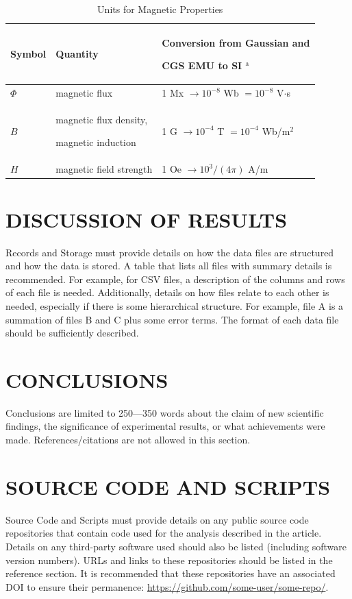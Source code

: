 \documentclass{IEEEoj-data}
\begin{document}
\begin{table}
\caption{Units for Magnetic Properties}
\label{table}
\setlength{\tabcolsep}{3pt}
\begin{tabular}{|p{25pt}|p{75pt}|p{115pt}|}
\hline
Symbol& 
Quantity& 
Conversion from Gaussian and \par CGS EMU to SI $^{\mathrm{a}}$ \\
\hline
$\Phi $& 
magnetic flux& 
1 Mx $\to  10^{-8}$ Wb $= 10^{-8}$ V$\cdot $s \\
$B$& 
magnetic flux density, \par magnetic induction& 
1 G $\to  10^{-4}$ T $= 10^{-4}$ Wb/m$^{2}$ \\
$H$& 
magnetic field strength& 
1 Oe $\to  10^{3}/(4\pi )$ A/m \\
\hline
\end{tabular}
\label{tab1}
\end{table}

\section*{DISCUSSION OF RESULTS} 

Records and Storage must provide details on how the data files are structured and how the data is stored. A table that lists all files with summary details is recommended. For example, for CSV files, a description of the columns and rows of each file is needed. Additionally, details on how files relate to each other is needed, especially if there is some hierarchical structure. For example, file A is a summation of files B and C plus some error terms. The format of each data file should be sufficiently described.

\balance

\section*{CONCLUSIONS} 

Conclusions are limited to 250—350 words about the claim of new scientific findings, the significance of experimental results, or what achievements were made. References/citations are not allowed in this section.
\\

\section*{SOURCE CODE AND SCRIPTS} 

Source Code and Scripts must provide details on any public source code repositories that contain code used for the analysis described in the article. Details on any third-party software used should also be listed (including software version numbers). URLs and links to these repositories should be listed in the reference section. It is recommended that these repositories have an associated DOI to ensure their permanence: \hyperlink{https://github.com/some-user/some-repo/}{https://github.com/some-user/some-repo/}.
\\
\end{document}
